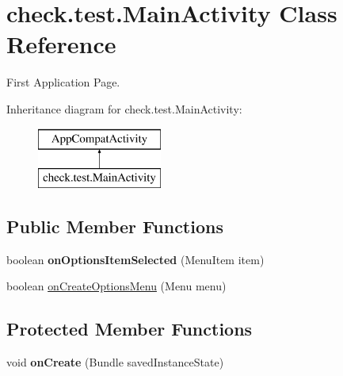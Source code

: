\hypertarget{classcheck_1_1test_1_1_main_activity}{}\section{check.\+test.\+Main\+Activity Class Reference}
\label{classcheck_1_1test_1_1_main_activity}


First Application Page.  


Inheritance diagram for check.\+test.\+Main\+Activity\+:\begin{figure}[H]
\begin{center}
\leavevmode
\includegraphics[height=2.000000cm]{classcheck_1_1test_1_1_main_activity}
\end{center}
\end{figure}
\subsection*{Public Member Functions}
\begin{DoxyCompactItemize}
\item 
\hypertarget{classcheck_1_1test_1_1_main_activity_aaafdc43b53167e93a6820e2e61f52c9c}{}boolean {\bfseries on\+Options\+Item\+Selected} (Menu\+Item item)\label{classcheck_1_1test_1_1_main_activity_aaafdc43b53167e93a6820e2e61f52c9c}

\item 
boolean \hyperlink{classcheck_1_1test_1_1_main_activity_a32779498a0628d0b7a6a95f503210c1a}{on\+Create\+Options\+Menu} (Menu menu)
\end{DoxyCompactItemize}
\subsection*{Protected Member Functions}
\begin{DoxyCompactItemize}
\item 
\hypertarget{classcheck_1_1test_1_1_main_activity_a57b96b92e4a448b3cb26c318310c7d23}{}void {\bfseries on\+Create} (Bundle saved\+Instance\+State)\label{classcheck_1_1test_1_1_main_activity_a57b96b92e4a448b3cb26c318310c7d23}

\end{DoxyCompactItemize}


